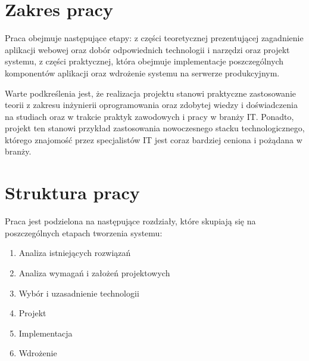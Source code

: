 \section*{Zakres pracy}

Praca obejmuje następujące etapy: z części teoretycznej prezentującej zagadnienie aplikacji webowej oraz dobór odpowiednich technologii i narzędzi oraz projekt systemu,
z części praktycznej, która obejmuje implementacje poszczególnych komponentów aplikacji oraz wdrożenie systemu na serwerze produkcyjnym.

Warte podkreślenia jest, że realizacja projektu stanowi praktyczne zastosowanie teorii z zakresu inżynierii oprogramowania oraz zdobytej wiedzy i doświadczenia na studiach
oraz w trakcie praktyk zawodowych i pracy w branży IT. Ponadto, projekt ten stanowi przykład zastosowania nowoczesnego stacku technologicznego, którego znajomość przez specjalistów IT jest coraz bardziej ceniona i pożądana w branży.

\section*{Struktura pracy}

Praca jest podzielona na następujące rozdziały, które skupiają się na poszczególnych etapach tworzenia systemu:

\begin{enumerate}
	\item Analiza istniejących rozwiązań
	\item Analiza wymagań i założeń projektowych
	\item Wybór i uzasadnienie technologii
	\item Projekt
	\item Implementacja
	\item Wdrożenie
\end{enumerate}



